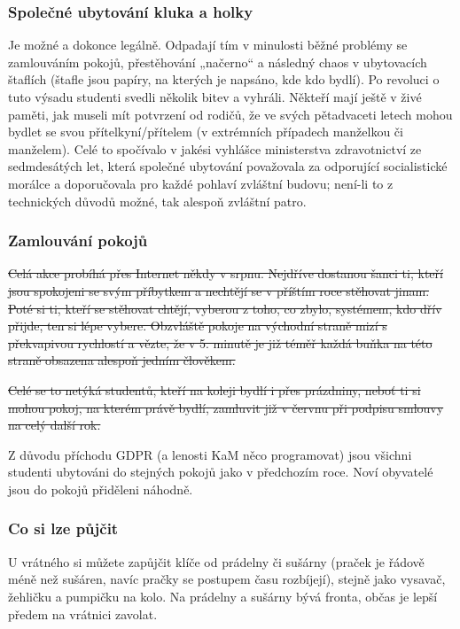 \subsubsection{Společné ubytování kluka a holky}
Je možné a dokonce legálně. Odpadají tím v minulosti běžné problémy se
zamlouváním pokojů, přestěhování „načerno“ a následný chaos v ubytovacích
štaflích (štafle jsou papíry, na kterých je napsáno, kde kdo bydlí). Po revoluci
o tuto výsadu studenti svedli několik bitev a vyhráli. Někteří mají ještě v živé
paměti, jak museli mít potvrzení od rodičů, že ve svých pětadvaceti letech mohou
bydlet se svou přítelkyní/přítelem (v extrémních případech manželkou či
manželem). Celé to spočívalo v jakési vyhlášce ministerstva zdravotnictví ze
sedmdesátých let, která společné ubytování považovala za odporující
socialistické morálce a doporučovala pro každé pohlaví zvláštní budovu; není-li
to z technických důvodů možné, tak alespoň zvláštní patro.


\subsubsection{Zamlouvání pokojů}
\sout{Celá akce probíhá přes Internet někdy v srpnu. Nejdříve dostanou šanci ti,
kteří
jsou spokojeni se svým příbytkem a nechtějí se v příštím roce stěhovat jinam.
Poté si ti, kteří se stěhovat chtějí, vyberou z toho, co zbylo, systémem, kdo
dřív přijde, ten si lépe vybere. Obzvláště pokoje na východní straně mizí s
překvapivou rychlostí a vězte, že v 5. minutě je již téměř každá buňka na této
straně obsazena alespoň jedním člověkem.}

\sout{Celé se to netýká studentů, kteří na koleji bydlí i přes prázdniny, neboť
ti si
mohou pokoj, na kterém právě bydlí, zamluvit již v červnu při podpisu smlouvy na
celý další rok.}

Z důvodu příchodu GDPR (a lenosti KaM něco programovat) jsou všichni studenti
ubytováni do stejných pokojů jako v předchozím roce. Noví obyvatelé jsou do
pokojů přiděleni náhodně.


\subsubsection{Co si lze půjčit}
U vrátného si můžete zapůjčit klíče od prádelny či sušárny (praček je řádově
méně než sušáren, navíc pračky se postupem času rozbíjejí), stejně jako vysavač,
žehličku a pumpičku na kolo. Na prádelny a sušárny bývá fronta, občas je lepší
předem na vrátnici zavolat.

